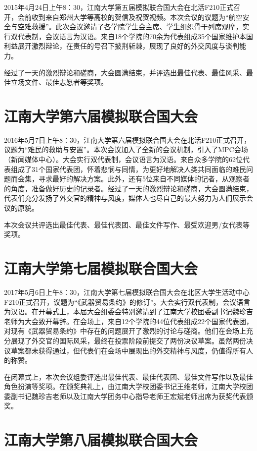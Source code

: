 \documentclass[a4paper,openany]{book}
\begin{document}
2015年4月24日上午8：30，江南大学第五届模拟联合国大会在北活F210正式召开，会前收到来自郑州大学等高校的贺信及祝贺视频。本次会议的议题为“航空安全与空难救援”。此次会议邀请了各学院学生会主席、学生组织骨干列席观摩，实行双代表制，会议语言为汉语。来自18个学院的70余为代表组成35个国家维护本国利益展开激烈辩论，在责任的号召下披荆斩棘，展现了良好的外交风度与谈判能力。

经过了一天的激烈辩论和磋商，大会圆满结束，并评选出最佳代表、最佳风采、最佳立场文件、最佳志愿者等奖项。

\section{江南大学第六届模拟联合国大会}

2016年5月7日上午8：30，江南大学第六届模拟联合国大会在北活F210正式召开，议题为“难民的救助与安置”。本次会议加入了全新的会议机制，引入了MPC会场（新闻媒体中心）。大会实行双代表制，会议语言为汉语。来自众多学院的62位代表组成了31个国家代表团，怀着悲悯与同情，为更好地解决人类共同面临的难民问题而会集，寻求最好的解决方案。此外，还有5位来自不同媒体的记者，从观察者的角度，准备做好历史的记录者。经过了一天的激烈辩论和磋商，大会圆满结束，代表们充分发扬了外交官的精神与风度，媒体人也尽自己的最大努力为人们展示会议的原貌。

本次会议共评选出最佳代表、最佳代表团、最佳文件写作、最受欢迎男/女代表等奖项。

\section{江南大学第七届模拟联合国大会}

2017年5月6日上午8：30，江南大学第七届模拟联合国大会在北区大学生活动中心F210正式召开，议题为“《武器贸易条约》的修订”。大会实行双代表制，会议语言为汉语。在开幕式上，本届大会组委会特别邀请到了江南大学校团委副书记魏珍吉老师为大会致开幕辞。在会场上，来自12个学院的44位代表组成22个国家代表团，对现有《武器贸易条约》中存在的问题展开了激烈的讨论与磋商。他们在会场上充分展现了外交官的国际风采，最终在投票阶段前提交了两份决议草案。虽然两份决议草案都未获得通过，但代表们在会场中展现出的外交精神与风度，仍值得所有人的称赞。

在闭幕式上，本次会议组委评选出最佳代表、最佳代表团、最佳文件写作以及最佳角色扮演等奖项。在颁奖典礼上，由江南大学校团委书记王维老师，江南大学校团委副书记魏珍吉老师以及江南大学团务中心指导老师王宏斌老师出席为获奖代表颁奖。

\section{江南大学第八届模拟联合国大会}
\end{document}
